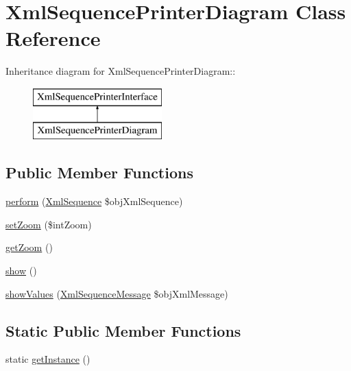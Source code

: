 \hypertarget{class_xml_sequence_printer_diagram}{
\section{XmlSequencePrinterDiagram Class Reference}
\label{class_xml_sequence_printer_diagram}
}
Inheritance diagram for XmlSequencePrinterDiagram::\begin{figure}[H]
\begin{center}
\leavevmode
\includegraphics[height=2cm]{class_xml_sequence_printer_diagram}
\end{center}
\end{figure}
\subsection*{Public Member Functions}
\begin{CompactItemize}
\item 
\hyperlink{class_xml_sequence_printer_diagram_a94b897abb072d1d895c2e63dfa066d2}{perform} (\hyperlink{class_xml_sequence}{XmlSequence} \$objXmlSequence)
\item 
\hyperlink{class_xml_sequence_printer_diagram_e80bb8be07efce8abf9af54488d3c616}{setZoom} (\$intZoom)
\item 
\hyperlink{class_xml_sequence_printer_diagram_71fbe6074cf81fab4eee271f16a6f189}{getZoom} ()
\item 
\hyperlink{class_xml_sequence_printer_diagram_bf7cd1d36e6867cefed731112b9ed8e8}{show} ()
\item 
\hyperlink{class_xml_sequence_printer_diagram_eda31caa1d4a613d270b3ca55accd2dd}{showValues} (\hyperlink{class_xml_sequence_message}{XmlSequenceMessage} \$objXmlMessage)
\end{CompactItemize}
\subsection*{Static Public Member Functions}
\begin{CompactItemize}
\item 
static \hyperlink{class_xml_sequence_printer_diagram_c11a145d18a480a3fa4d8404f9aa1649}{getInstance} ()
\end{CompactItemize}
